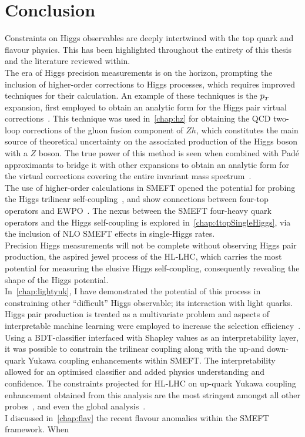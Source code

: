 \chapter{Conclusion}
Constraints on Higgs observables are deeply intertwined with the top quark and flavour physics. This has been highlighted throughout the entirety of this thesis and the literature reviewed within. \\  The era of Higgs precision measurements is on the horizon, prompting the inclusion of higher-order corrections to Higgs processes, which requires improved techniques for their calculation. An example of these techniques is the $p_{\scriptscriptstyle T}$ expansion, first employed to obtain an analytic form for the Higgs pair virtual corrections~\cite{Bonciani:2018omm}. This technique was used in~\autoref{chap:hz} for obtaining the QCD two-loop corrections of the gluon fusion component of $Zh$, which constitutes the main source of theoretical uncertainty on the associated production of the Higgs boson with a $Z$ boson. The true power of this method is seen when combined with Pad\'e approximants to bridge it with other expansions to obtain an analytic form for the virtual corrections covering the entire invariant mass spectrum~\cite{Bellafronte:2022jmo}. \\ The use of higher-order calculations in SMEFT opened the potential for probing the Higgs trilinear self-coupling~\cite{Gorbahn:2016uoy, Degrassi:2016wml, Bizon:2016wgr, Maltoni:2017ims, Degrassi:2021uik}, and show connections between four-top operators and EWPO~\cite{Dawson:2022bxd}. The nexus between the SMEFT four-heavy quark operators and the Higgs self-coupling is explored in~\autoref{chap:4topSingleHiggs}, via the inclusion of NLO SMEFT effects in single-Higgs rates. \\ Precision Higgs measurements will not be complete without observing Higgs pair production, the aspired jewel process of the HL-LHC, which carries the most potential for measuring the elusive Higgs self-coupling,  consequently revealing the shape of the Higgs potential.\\ In~\autoref{chap:lightyuk}, I have demonstrated the potential of this process in constraining other ``difficult'' Higgs observable; its interaction with light quarks. Higgs pair production is treated as a multivariate problem and aspects of interpretable machine learning were employed to increase the selection efficiency~\cite{Grojean:2020ech}. Using a BDT-classifier interfaced with Shapley values as an interpretability layer, it was possible to constrain the trilinear coupling along with the up-and down-quark Yukawa coupling enhancements within SMEFT. The interpretability allowed for an optimised classifier and added physics understanding and confidence. The constraints projected for HL-LHC on up-quark Yukawa coupling enhancement obtained from this analysis are the most stringent amongst all other probes~\cite{Soreq:2016rae,Falkowski:2020znk,Aguilar-Saavedra:2020rgo,Yu:2017vul}, and even the global analysis~\cite{deBlas:2019rxi}.  \\ I discussed in~\autoref{chap:flav} the recent flavour anomalies within the SMEFT framework. When 